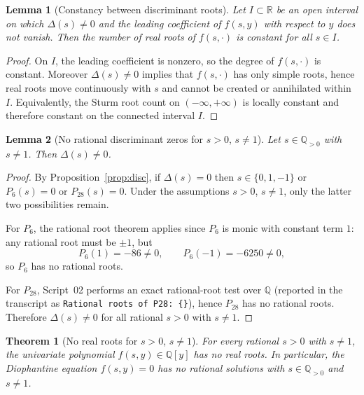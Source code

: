 \documentclass[12pt]{article}
\newtheorem{theorem}{Theorem}
\newtheorem{lemma}{Lemma}
\theoremstyle{remark}
\theoremstyle{definition}
\begin{document}
\begin{lemma}[Constancy between discriminant roots]\label{lem:sturm_const}
Let $I\subset\mathbb{R}$ be an open interval on which $\Delta(s)\neq 0$ and the leading coefficient of $f(s,y)$ with respect to $y$ does not vanish.
Then the number of real roots of $f(s,\cdot)$ is constant for all $s\in I$.
\end{lemma}

\begin{proof}
On $I$, the leading coefficient is nonzero, so the degree of $f(s,\cdot)$ is constant.
Moreover $\Delta(s)\neq 0$ implies that $f(s,\cdot)$ has only simple roots, hence real roots move continuously with $s$ and cannot be created or annihilated within $I$.
Equivalently, the Sturm root count on $(-\infty,+\infty)$ is locally constant and therefore constant on the connected interval $I$.
\end{proof}

\begin{lemma}[No rational discriminant zeros for $s>0$, $s\neq 1$]\label{lem:disc_rational}
Let $s\in\mathbb{Q}_{>0}$ with $s\neq 1$.
Then \(\Delta(s)\neq 0\).
\end{lemma}

\begin{proof}
By Proposition~\ref{prop:disc}, if \(\Delta(s)=0\) then \(s\in\{0,1,-1\}\) or \(P_6(s)=0\) or \(P_{28}(s)=0\).
Under the assumptions \(s>0\), \(s\neq 1\), only the latter two possibilities remain.

For \(P_6\), the rational root theorem applies since \(P_6\) is monic with constant term \(1\): any rational root must be \(\pm 1\), but
\[
P_6(1)= -86\neq 0,\qquad P_6(-1)=-6250\neq 0,
\]
so \(P_6\) has no rational roots.

For \(P_{28}\), Script~02 performs an exact rational-root test over \(\mathbb{Q}\) (reported in the transcript as \texttt{Rational roots of P28: \{\}}), hence \(P_{28}\) has no rational roots.
Therefore \(\Delta(s)\neq 0\) for all rational \(s>0\) with \(s\neq 1\).
\end{proof}

\begin{theorem}[No real roots for $s>0$, $s\neq 1$]\label{thm:noreal}
For every rational $s>0$ with $s\neq 1$, the univariate polynomial $f(s,y)\in\mathbb{Q}[y]$ has no real roots.
In particular, the Diophantine equation $f(s,y)=0$ has no rational solutions with $s\in\mathbb{Q}_{>0}$ and $s\neq 1$.
\end{theorem}
\end{document}
